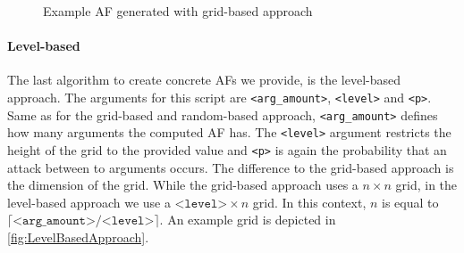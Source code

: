 \begin{figure}[h]
\begin{subfigure}[t]{0.3\textwidth}
    \label{af:ImplementationGridBasedExampleAFsc}
\end{subfigure}
\caption{Example AF generated with grid-based approach}
\label{fig:ImplementationGridBasedExampleAFs}
\end{figure}
\vspace{0.3cm}



\paragraph{Level-based} The last algorithm to create concrete AFs we provide, is the level-based approach. The arguments for this script are \texttt{<arg\_amount>}, \texttt{<level>} and \texttt{<p>}. Same as for the grid-based and random-based approach, \texttt{<arg\_amount>} defines how many arguments the computed AF has. The \texttt{<level>} argument restricts the height of the grid to the provided value and \texttt{<p>} is again the probability that an attack between to arguments occurs. The difference to the grid-based approach is the dimension of the grid. While the grid-based approach uses a $n \times n$ grid, in the level-based approach we use a $\texttt{<level>} \times n$ grid. In this context, $n$ is equal to $\lceil \texttt{<arg\_amount>}/\texttt{<level>} \rceil$. An example grid is depicted in \cref{fig:LevelBasedApproach}.


